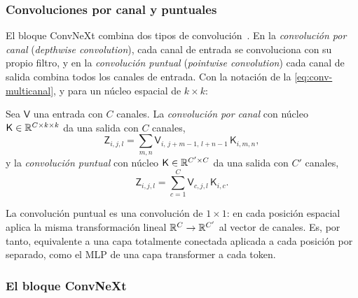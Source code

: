 \subsubsection{Convoluciones por canal y puntuales}

El bloque ConvNeXt combina dos tipos de convolución~\cite{todi2023convnext}. En
la \emph{convolución por canal} (\emph{depthwise convolution}), cada canal de
entrada se convoluciona con su propio filtro, y en la \emph{convolución puntual}
(\emph{pointwise convolution}) cada canal de salida combina todos los canales de
entrada. Con la notación de la \cref{eq:conv-multicanal}, y para un núcleo
espacial de $k\times k$:

\begin{definicion}\label{def:conv-depthwise}
Sea $\mathsf{V}$ una entrada con $C$ canales. La \emph{convolución por canal}
con núcleo $\mathsf{K}\in\mathbb{R}^{C\times k\times k}$ da una salida con $C$ canales,
\[
  \mathsf{Z}_{i,j,l} = \sum_{m,n} \mathsf{V}_{i,\, j+m-1,\, l+n-1}\, \mathsf{K}_{i,m,n},
\]
y la \emph{convolución puntual} con núcleo $\mathsf{K}\in\mathbb{R}^{C'\times C}$ da una
salida con $C'$ canales,
\[
  \mathsf{Z}_{i,j,l} = \sum_{c=1}^{C} \mathsf{V}_{c,j,l}\, \mathsf{K}_{i,c}.
\]
\end{definicion}

La convolución puntual es una convolución de $1\times1$: en cada posición
espacial aplica la misma transformación lineal $\mathbb{R}^{C}\to\mathbb{R}^{C'}$ al vector de
canales. Es, por tanto, equivalente a una capa totalmente conectada aplicada a
cada posición por separado, como el MLP de una capa transformer a cada token.

\subsubsection{El bloque ConvNeXt}

